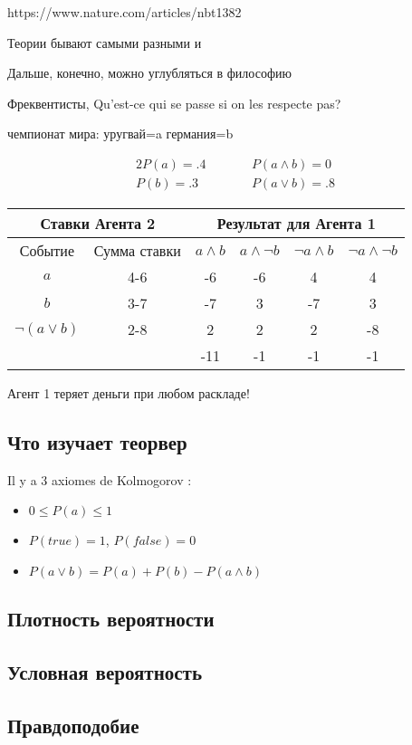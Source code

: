 \documentclass[A4,11pt]{article}
\begin{document}
https://www.nature.com/articles/nbt1382



Теории бывают самыми разными и 


Дальше, конечно, можно углубляться в философию



Фреквентисты,
Qu'est-ce qui se passe si on les respecte pas?

чемпионат мира: уругвай=a германия=b

\begin{alignat*}{2}
P(a) = .4 & \qquad & P(a\wedge b) = 0 \\
P(b) = .3 &        & P(a\vee b) = .8
\end{alignat*}
\begin{tabular}{cccccc}
\multicolumn{2}{c}{Ставки Агента 2}  &  \multicolumn{4}{c}{Результат для Агента 1} \\
\hline
{\tiny Событие} & {\tiny Сумма ставки} & {\tiny $a\wedge b$} & {\tiny $a\wedge \neg b$} &  {\tiny $\neg a\wedge b$} &  {\tiny $\neg a\wedge\neg b$} \\
\hline
$a$             & 4-6 & -6 & -6 &  4 &  4 \\
$b$             & 3-7 & -7 &  3 & -7 &  3 \\
$\neg(a\vee b)$ & 2-8 &  2 &  2 &  2 & -8 \\
\hline
                &     &-11 & -1 & -1 & -1
\end{tabular}

Агент 1 теряет деньги при любом раскладе!

\subsection{Что изучает теорвер}

Il y a 3 axiomes de Kolmogorov :
\begin{itemize}
\item $0\leq P(a)\leq 1$
\item $P(true)=1$, $P(false) = 0$
\item $P(a\vee b) = P(a) + P(b) - P(a\wedge b)$
\end{itemize}

\subsection{Плотность вероятности}

\subsection{Условная вероятность}

\subsection{Правдоподобие}
\end{document}
